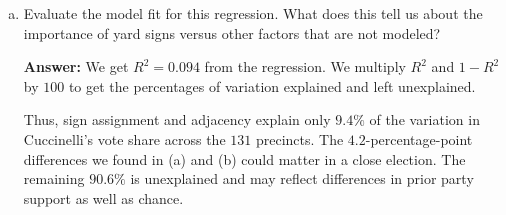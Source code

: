 \documentclass[12pt,letterpaper]{article}
\newcommand{\rcode}[2]{}
\newcommand{\answer}{\par\vspace{.18cm}\noindent\textbf{Answer:} }
\begin{document}
\begin{enumerate}[(a)]
\item Evaluate the model fit for this regression. What does this tell us about the importance of yard signs versus other factors that are not modeled?

\answer We get $R^2=0.094$ from the regression. We multiply $R^2$ and $1-R^2$ by $100$ to get the percentages of variation explained and left unexplained.

\rcode{87}{89}

\par\nobreak
{\setlength{\tabcolsep}{4pt}\renewcommand{\arraystretch}{0.93}%
\noindent{}\par}
\smallskip

Thus, sign assignment and adjacency explain only $9.4\%$ of the variation in Cuccinelli's vote share across the $131$ precincts. The $4.2$-percentage-point differences we found in (a) and (b) could matter in a close election. The remaining $90.6\%$ is unexplained and may reflect differences in prior party support as well as chance.
\end{enumerate}
\end{document}

